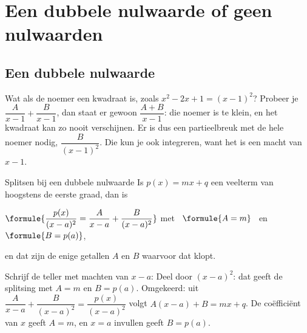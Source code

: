\section{Een dubbele nulwaarde of geen nulwaarden}

\subsection{Een dubbele nulwaarde}

Wat als de noemer een kwadraat is, zoals $x^2 - 2x + 1 = (x - 1)^2$? Probeer je $\dfrac{A}{x - 1} + \dfrac{B}{x - 1}$, dan staat er gewoon $\dfrac{A + B}{x - 1}$: die noemer is te klein, en het kwadraat kan zo nooit verschijnen. Er is dus een partieelbreuk met de hele noemer nodig, $\dfrac{B}{(x - 1)^2}$. Die kun je ook integreren, want het is een macht van $x - 1$.

\begin{theorie}
\begin{stelling}{Splitsen bij een dubbele nulwaarde}
Is $p(x) = mx + q$ een veelterm van hoogstens de eerste graad, dan is

\vspace{1mm}
\qquad $\formule{\dfrac{p(x)}{(x - a)^2} = \dfrac{A}{x - a} + \dfrac{B}{(x - a)^2}}$ \qquad met \ $\formule{A = m}$ \ en \ $\formule{B = p(a)}$,

\vspace{1mm}
en dat zijn de enige getallen $A$ en $B$ waarvoor dat klopt.
\end{stelling}

\begin{bewijs}
Schrijf de teller met machten van $x - a$:
Deel door $(x - a)^2$: dat geeft de splitsing met $A = m$ en $B = p(a)$. Omgekeerd: uit $\dfrac{A}{x - a} + \dfrac{B}{(x - a)^2} = \dfrac{p(x)}{(x - a)^2}$ volgt $A(x - a) + B = mx + q$. De coëfficiënt van $x$ geeft $A = m$, en $x = a$ invullen geeft $B = p(a)$.
\end{bewijs}
\end{theorie}


